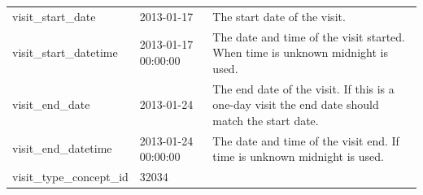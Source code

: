 \documentclass[]{book}
\begin{document}
\begin{longtable}[]{@{}lll@{}}
\begin{minipage}[t]{0.25\columnwidth}
visit\_start\_date\strut
\end{minipage} & \begin{minipage}[t]{0.17\columnwidth}\raggedright\strut
2013-01-17\strut
\end{minipage} & \begin{minipage}[t]{0.49\columnwidth}\raggedright\strut
The start date of the visit.\strut
\end{minipage}\tabularnewline
\begin{minipage}[t]{0.25\columnwidth}\raggedright\strut
visit\_start\_datetime\strut
\end{minipage} & \begin{minipage}[t]{0.17\columnwidth}\raggedright\strut
2013-01-17 00:00:00\strut
\end{minipage} & \begin{minipage}[t]{0.49\columnwidth}\raggedright\strut
The date and time of the visit started. When time is unknown midnight is
used.\strut
\end{minipage}\tabularnewline
\begin{minipage}[t]{0.25\columnwidth}\raggedright\strut
visit\_end\_date\strut
\end{minipage} & \begin{minipage}[t]{0.17\columnwidth}\raggedright\strut
2013-01-24\strut
\end{minipage} & \begin{minipage}[t]{0.49\columnwidth}\raggedright\strut
The end date of the visit. If this is a one-day visit the end date
should match the start date.\strut
\end{minipage}\tabularnewline
\begin{minipage}[t]{0.25\columnwidth}\raggedright\strut
visit\_end\_datetime\strut
\end{minipage} & \begin{minipage}[t]{0.17\columnwidth}\raggedright\strut
2013-01-24 00:00:00\strut
\end{minipage} & \begin{minipage}[t]{0.49\columnwidth}\raggedright\strut
The date and time of the visit end. If time is unknown midnight is
used.\strut
\end{minipage}\tabularnewline
\begin{minipage}[t]{0.25\columnwidth}\raggedright\strut
visit\_type\_concept\_id\strut
\end{minipage} & \begin{minipage}[t]{0.17\columnwidth}\raggedright\strut
32034\strut
\end{minipage} & \begin{minipage}[t]{0.49\columnwidth}\raggedright\strut

\end{minipage}
\end{longtable}
\end{document}

